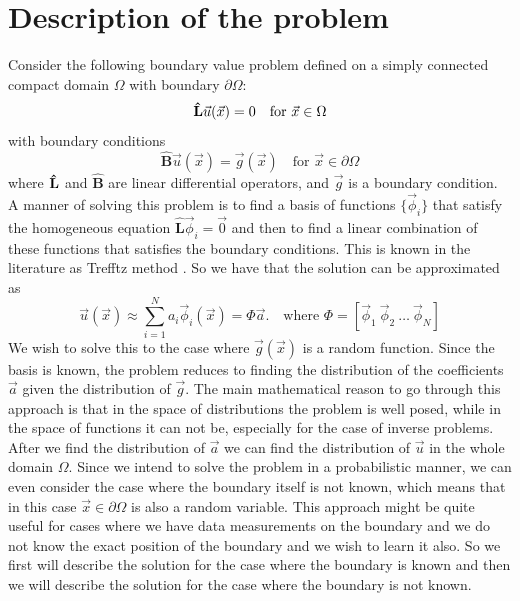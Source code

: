 \documentclass{article}
\begin{document}
\section{Description of the problem}
Consider the following boundary value problem defined on a simply connected compact domain $\Omega$ with boundary $\partial \Omega$:
\begin{equation}
    \mathbf{\hat{\mkern1mu L}} \vec{u}(\vec{x}) = 0 \quad \text{for } \vec{x} \in \Omega
\end{equation}
with boundary conditions
\begin{equation}
    \mathbf{\hat{B}} \vec{u}(\vec{x}) = \vec{g}(\vec{x}) \quad \text{for } \vec{x} \in \partial \Omega
\end{equation}
where $\mathbf{\hat{ \mkern1mu L}}$ and $\mathbf{\hat{B}}$ are linear differential operators, and $\vec{g}$ is a boundary condition.  A manner of solving this problem is to find a basis of functions $\{\vec{\phi}_i\}$ that satisfy the homogeneous equation $\mathbf{\hat{L}} \vec{\phi}_i = \vec{0}$ and then to find a linear combination of these functions that satisfies the boundary conditions. This is known in the literature as Trefftz method \cite{}. So we have that the solution can be approximated as
\begin{equation}
    \vec{u}(\vec{x}) \approx \sum_{i=1}^N a_i \vec{\phi}_i(\vec{x})= \Phi \vec{a}. \quad \text{where } \Phi = [\vec{\phi}_1 \ \vec{\phi}_2 \ \ldots \ \vec{\phi}_N]
\end{equation}
We wish to solve this to the case where $\vec{g}(\vec{x})$ is a random function. Since the basis is known, the problem reduces to finding the distribution of the coefficients $\vec{a}$ given the distribution of $\vec{g}$. The main mathematical reason to go through this approach is that in the space of distributions the problem is well posed, while in the space of functions it can not be, especially for the case of inverse problems. After we find the distribution of $\vec{a}$ we can find the distribution of $\vec{u}$ in the whole domain $\Omega$. Since we intend to solve the problem in a probabilistic manner, we can even consider the case where the boundary itself is not known, which means that in this case $\vec{x} \in \partial \Omega$ is also a random variable. This approach might be quite useful for cases where we have data measurements on the boundary and we do not know the exact position of the boundary and we wish to learn it also. So we first will describe the solution for the case where the boundary is known and then we will describe the solution for the case where the boundary is not known.
\end{document}
